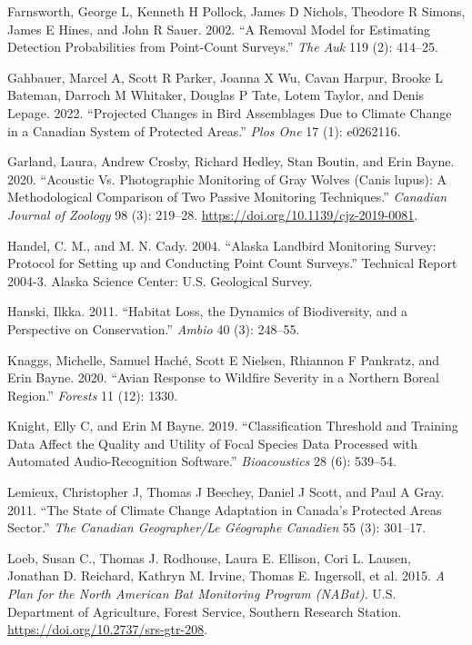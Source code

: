 \documentclass[
  letterpaper,
  DIV=11,
  numbers=noendperiod,
  oneside]{scrartcl}
\newlength{\cslhangindent}
\newenvironment{CSLReferences}[2] %
 {\begin{list}{}{%
  \setlength{\itemindent}{0pt}
  \setlength{\leftmargin}{0pt}
  \setlength{\parsep}{0pt}
  \ifodd #1
   \setlength{\leftmargin}{\cslhangindent}
   \setlength{\itemindent}{-1\cslhangindent}
  \fi
  \setlength{\itemsep}{#2\baselineskip}}}
 {\end{list}}
\begin{document}
\begin{CSLReferences}{1}{0}
Farnsworth, George L, Kenneth H Pollock, James D Nichols, Theodore R
Simons, James E Hines, and John R Sauer. 2002. {``A Removal Model for
Estimating Detection Probabilities from Point-Count Surveys.''}
\emph{The Auk} 119 (2): 414--25.

Gahbauer, Marcel A, Scott R Parker, Joanna X Wu, Cavan Harpur, Brooke L
Bateman, Darroch M Whitaker, Douglas P Tate, Lotem Taylor, and Denis
Lepage. 2022. {``Projected Changes in Bird Assemblages Due to Climate
Change in a Canadian System of Protected Areas.''} \emph{Plos One} 17
(1): e0262116.

Garland, Laura, Andrew Crosby, Richard Hedley, Stan Boutin, and Erin
Bayne. 2020. {``Acoustic Vs. Photographic Monitoring of Gray Wolves
({Canis lupus}): A Methodological Comparison of Two Passive Monitoring
Techniques.''} \emph{Canadian Journal of Zoology} 98 (3): 219--28.
\url{https://doi.org/10.1139/cjz-2019-0081}.

Handel, C. M., and M. N. Cady. 2004. {``Alaska Landbird Monitoring
Survey: Protocol for Setting up and Conducting Point Count Surveys.''}
Technical Report 2004-3. Alaska Science Center: U.S. Geological Survey.

Hanski, Ilkka. 2011. {``Habitat Loss, the Dynamics of Biodiversity, and
a Perspective on Conservation.''} \emph{Ambio} 40 (3): 248--55.

Knaggs, Michelle, Samuel Haché, Scott E Nielsen, Rhiannon F Pankratz,
and Erin Bayne. 2020. {``Avian Response to Wildfire Severity in a
Northern Boreal Region.''} \emph{Forests} 11 (12): 1330.

Knight, Elly C, and Erin M Bayne. 2019. {``Classification Threshold and
Training Data Affect the Quality and Utility of Focal Species Data
Processed with Automated Audio-Recognition Software.''}
\emph{Bioacoustics} 28 (6): 539--54.

Lemieux, Christopher J, Thomas J Beechey, Daniel J Scott, and Paul A
Gray. 2011. {``The State of Climate Change Adaptation in Canada's
Protected Areas Sector.''} \emph{The Canadian Geographer/Le G{é}ographe
Canadien} 55 (3): 301--17.

Loeb, Susan C., Thomas J. Rodhouse, Laura E. Ellison, Cori L. Lausen,
Jonathan D. Reichard, Kathryn M. Irvine, Thomas E. Ingersoll, et al.
2015. \emph{A Plan for the North American Bat Monitoring Program
(NABat)}. U.S. Department of Agriculture, Forest Service, Southern
Research Station. \url{https://doi.org/10.2737/srs-gtr-208}.


\end{CSLReferences}
\end{document}
